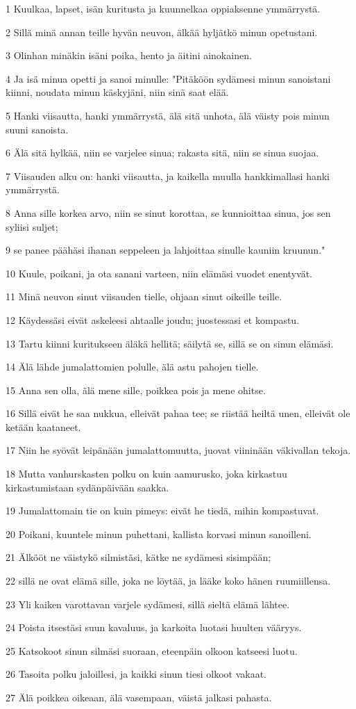 \par 1 Kuulkaa, lapset, isän kuritusta ja kuunnelkaa oppiaksenne ymmärrystä.
\par 2 Sillä minä annan teille hyvän neuvon, älkää hyljätkö minun opetustani.
\par 3 Olinhan minäkin isäni poika, hento ja äitini ainokainen.
\par 4 Ja isä minua opetti ja sanoi minulle: "Pitäköön sydämesi minun sanoistani kiinni, noudata minun käskyjäni, niin sinä saat elää.
\par 5 Hanki viisautta, hanki ymmärrystä, älä sitä unhota, älä väisty pois minun suuni sanoista.
\par 6 Älä sitä hylkää, niin se varjelee sinua; rakasta sitä, niin se sinua suojaa.
\par 7 Viisauden alku on: hanki viisautta, ja kaikella muulla hankkimallasi hanki ymmärrystä.
\par 8 Anna sille korkea arvo, niin se sinut korottaa, se kunnioittaa sinua, jos sen syliisi suljet;
\par 9 se panee päähäsi ihanan seppeleen ja lahjoittaa sinulle kauniin kruunun."
\par 10 Kuule, poikani, ja ota sanani varteen, niin elämäsi vuodet enentyvät.
\par 11 Minä neuvon sinut viisauden tielle, ohjaan sinut oikeille teille.
\par 12 Käydessäsi eivät askeleesi ahtaalle joudu; juostessasi et kompastu.
\par 13 Tartu kiinni kuritukseen äläkä hellitä; säilytä se, sillä se on sinun elämäsi.
\par 14 Älä lähde jumalattomien polulle, älä astu pahojen tielle.
\par 15 Anna sen olla, älä mene sille, poikkea pois ja mene ohitse.
\par 16 Sillä eivät he saa nukkua, elleivät pahaa tee; se riistää heiltä unen, elleivät ole ketään kaataneet.
\par 17 Niin he syövät leipänään jumalattomuutta, juovat viininään väkivallan tekoja.
\par 18 Mutta vanhurskasten polku on kuin aamurusko, joka kirkastuu kirkastumistaan sydänpäivään saakka.
\par 19 Jumalattomain tie on kuin pimeys: eivät he tiedä, mihin kompastuvat.
\par 20 Poikani, kuuntele minun puhettani, kallista korvasi minun sanoilleni.
\par 21 Älkööt ne väistykö silmistäsi, kätke ne sydämesi sisimpään;
\par 22 sillä ne ovat elämä sille, joka ne löytää, ja lääke koko hänen ruumiillensa.
\par 23 Yli kaiken varottavan varjele sydämesi, sillä sieltä elämä lähtee.
\par 24 Poista itsestäsi suun kavaluus, ja karkoita luotasi huulten vääryys.
\par 25 Katsokoot sinun silmäsi suoraan, eteenpäin olkoon katseesi luotu.
\par 26 Tasoita polku jaloillesi, ja kaikki sinun tiesi olkoot vakaat.
\par 27 Älä poikkea oikeaan, älä vasempaan, väistä jalkasi pahasta.

